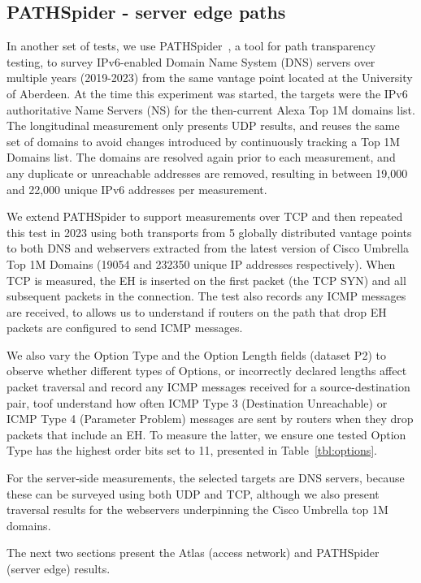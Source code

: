 \documentclass[conference]{IEEEtran}
\begin{document}
    \subsection{PATHSpider - server edge paths}
    \label{sec:pathspider-methodology}

In another set of tests, we use PATHSpider~\cite{learmonth2016pathspider}, a tool for path transparency testing, to survey IPv6-enabled Domain Name System (DNS) servers over multiple years (2019-2023) from the same vantage point located at the University of Aberdeen. At the time this experiment was started, the targets were the IPv6 authoritative Name Servers (NS) for the then-current Alexa Top 1M domains list. The longitudinal measurement only presents UDP results, and reuses the same set of domains to avoid changes introduced by continuously tracking a Top 1M Domains list. The domains are resolved again prior to each measurement, and any duplicate or unreachable addresses are removed, resulting in between 19,000 and 22,000 unique IPv6 addresses per measurement.

We extend PATHSpider to support measurements over TCP and then repeated this test in 2023 using both transports from 5 globally distributed vantage points to both DNS and webservers extracted from the latest version of Cisco Umbrella Top 1M Domains (19054 and 232350 unique IP addresses respectively). When TCP is measured, the EH is inserted on the first packet (the TCP SYN) and all subsequent packets in the connection.
The test also records any ICMP messages are received, to allows us to understand if routers on the path that drop EH packets are configured to send ICMP messages.

We also vary the Option Type and the Option Length fields (dataset P2) to observe whether different types of Options, or incorrectly declared lengths affect packet traversal and record any ICMP messages received
for a source-destination pair, toof understand how often ICMP Type 3 (Destination Unreachable) or ICMP Type 4 (Parameter Problem) messages are sent by routers when they drop packets that include an EH. To measure the latter, we ensure one tested Option Type has the highest order bits set to 11, presented in Table~\ref{tbl:options}.

For the server-side measurements, the selected targets  are DNS servers, because these can be surveyed using both UDP and TCP, although we also present traversal results for the webservers underpinning the Cisco Umbrella top 1M domains.

The next two sections present the Atlas (access network) and PATHSpider (server edge) results.
\end{document}

